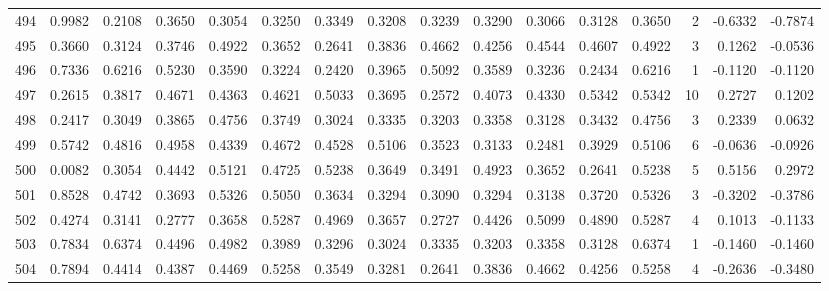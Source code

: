 \begin{tabular}{lrrrrrrrrrrrrrrr}
494 &      0.9982 &  0.2108 &  0.3650 &  0.3054 &  0.3250 &  0.3349 &  0.3208 &  0.3239 &  0.3290 &  0.3066 &   0.3128 &     0.3650 &      2 &                   -0.6332 &                    -0.7874 \\
495 &      0.3660 &  0.3124 &  0.3746 &  0.4922 &  0.3652 &  0.2641 &  0.3836 &  0.4662 &  0.4256 &  0.4544 &   0.4607 &     0.4922 &      3 &                    0.1262 &                    -0.0536 \\
496 &      0.7336 &  0.6216 &  0.5230 &  0.3590 &  0.3224 &  0.2420 &  0.3965 &  0.5092 &  0.3589 &  0.3236 &   0.2434 &     0.6216 &      1 &                   -0.1120 &                    -0.1120 \\
497 &      0.2615 &  0.3817 &  0.4671 &  0.4363 &  0.4621 &  0.5033 &  0.3695 &  0.2572 &  0.4073 &  0.4330 &   0.5342 &     0.5342 &     10 &                    0.2727 &                     0.1202 \\
498 &      0.2417 &  0.3049 &  0.3865 &  0.4756 &  0.3749 &  0.3024 &  0.3335 &  0.3203 &  0.3358 &  0.3128 &   0.3432 &     0.4756 &      3 &                    0.2339 &                     0.0632 \\
499 &      0.5742 &  0.4816 &  0.4958 &  0.4339 &  0.4672 &  0.4528 &  0.5106 &  0.3523 &  0.3133 &  0.2481 &   0.3929 &     0.5106 &      6 &                   -0.0636 &                    -0.0926 \\
500 &      0.0082 &  0.3054 &  0.4442 &  0.5121 &  0.4725 &  0.5238 &  0.3649 &  0.3491 &  0.4923 &  0.3652 &   0.2641 &     0.5238 &      5 &                    0.5156 &                     0.2972 \\
501 &      0.8528 &  0.4742 &  0.3693 &  0.5326 &  0.5050 &  0.3634 &  0.3294 &  0.3090 &  0.3294 &  0.3138 &   0.3720 &     0.5326 &      3 &                   -0.3202 &                    -0.3786 \\
502 &      0.4274 &  0.3141 &  0.2777 &  0.3658 &  0.5287 &  0.4969 &  0.3657 &  0.2727 &  0.4426 &  0.5099 &   0.4890 &     0.5287 &      4 &                    0.1013 &                    -0.1133 \\
503 &      0.7834 &  0.6374 &  0.4496 &  0.4982 &  0.3989 &  0.3296 &  0.3024 &  0.3335 &  0.3203 &  0.3358 &   0.3128 &     0.6374 &      1 &                   -0.1460 &                    -0.1460 \\
504 &      0.7894 &  0.4414 &  0.4387 &  0.4469 &  0.5258 &  0.3549 &  0.3281 &  0.2641 &  0.3836 &  0.4662 &   0.4256 &     0.5258 &      4 &                   -0.2636 &                    -0.3480 \\

\end{tabular}
